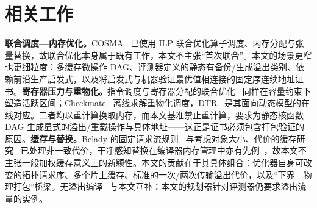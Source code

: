 \section{相关工作}\label{sec:related}
\textbf{联合调度—内存优化。}COSMA~\citep{li2023combined} 已使用 ILP 联合优化算子调度、内存分配与张量替换，故联合优化本身属于既有工作，本文不主张“首次联合”。本文的场景更窄也更细粒度：多缓存微操作 DAG、评测器定义的静态有备份/生成溢出类别、依赖前沿生产启发式，以及将启发式与机器验证最优值相连接的固定序连续地址证书。\textbf{寄存器压力与重物化。}指令调度与寄存器分配的联合优化~\citep{goodman1988integrated,shobaki2013preallocation,shobaki2022register} 同样在容量约束下塑造活跃区间；Checkmate~\citep{jain2019checkmate} 离线求解重物化调度，DTR~\citep{kirisame2020dtr} 是其面向动态模型的在线对应。二者均以重计算换取内存，而本文基准禁止重计算，要求为静态核函数 DAG 生成显式的溢出/重载操作与具体地址——这正是证书必须包含打包验证的原因。\textbf{缓存与替换。}Belady 的固定请求流规则~\citep{belady1966study} 与考虑对象大小、代价的缓存研究~\citep{coester2022blockaware} 已处理非一致代价，干净感知替换在编译器内存管理中亦有先例~\citep{liberatore1999evaluation,guo2004belady}，故本文不主张一般加权缓存意义上的新颖性。本文的贡献在于其具体组合：优化器自身可改变的拓扑请求序、多个片上缓存、标准的一次/两次传输溢出代价，以及“下界—物理打包”桥梁。无溢出编译~\citep{chatarasi2026spillfree} 与本文互补：本文的规划器针对评测器仍要求溢出流量的实例。
